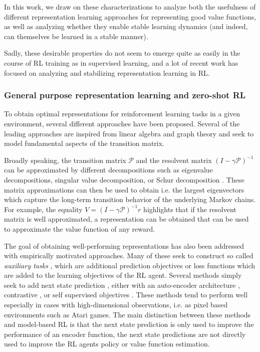 In this work, we draw on these characterizations to analyze both the usefulness of different representation learning approaches for representing good value functions, as well as analyzing whether they enable stable learning dynamics (and indeed, can themselves be learned in a stable manner).

Sadly, these desirable properties do not seem to emerge quite as easily in the course of RL training as in supervised learning, and a lot of recent work has focused on analyzing and stabilizing representation learning in RL.

\subsubsection{General purpose representation learning and zero-shot RL}

To obtain optimal representations for reinforcement learning tasks in a given environment, several different approaches have been proposed.
Several of the leading approaches are inspired from linear algebra and graph theory and seek to model fundamental aspects of the transition matrix.

Broadly speaking, the transition matrix $\mathcal{P}$ and the resolvent matrix $(I - \gamma \mathcal{P})^{-1}$ can be approximated by different decompositions such as eigenvalue decompositions, singular value decomposition, or Schur decomposition \parencite{ghosh2020representations}.
These matrix approximations can then be used to obtain i.e. the largest eigenvectors which capture the long-term transition behavior of the underlying Markov chains.
For example, the equality $V = (I - \gamma \mathcal{P})^{-1} r$ highlights that if the resolvent matrix is well approximated, a representation can be obtained that can be used to approximate the value function of any reward.

The goal of obtaining well-performing representations has also been addressed with empirically motivated approaches.
Many of these seek to construct so called \emph{auxiliary tasks} \parencite{jaderberg2017reinforcement}, which are additional prediction objectives or loss functions which are added to the learning objectives of the RL agent.
Several methods simply seek to add next state prediction , either with an auto-encoder architecture \parencite{jaderberg2017reinforcement}, contrastive \parencite{Laskin2020-af}, or self supervised objectives \parencite{Gelada2019-ti,Schwarzer2021-ew,Schwarzer2021-if,Tang2023-ah}.
These methods tend to perform well especially in cases with high-dimensional observations, i.e. as pixel based environments such as Atari games.
The main distinction between these methods and model-based RL is that the next state prediction is only used to improve the performance of an encoder function, the next state predictions are not directly used to improve the RL agents policy or value function estimation.

